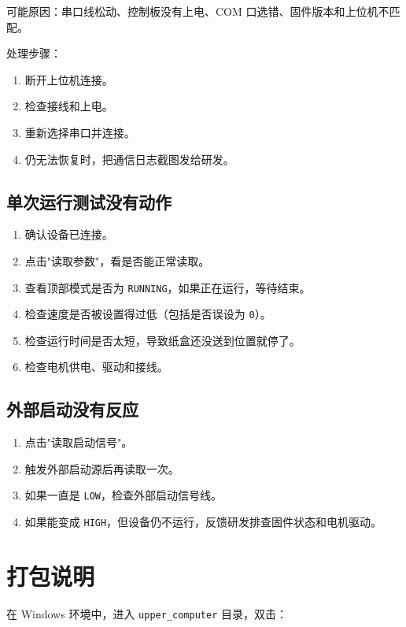 可能原因：串口线松动、控制板没有上电、COM 口选错、固件版本和上位机不匹配。

处理步骤：
\begin{enumerate}[label={(\arabic*)}]
    \item 断开上位机连接。
    \item 检查接线和上电。
    \item 重新选择串口并连接。
    \item 仍无法恢复时，把通信日志截图发给研发。
\end{enumerate}

\subsection{单次运行测试没有动作}

\begin{enumerate}[label={(\arabic*)}]
    \item 确认设备已连接。
    \item 点击"读取参数"，看是否能正常读取。
    \item 查看顶部模式是否为 \texttt{RUNNING}，如果正在运行，等待结束。
    \item 检查速度是否被设置得过低（包括是否误设为 \texttt{0}）。
    \item 检查运行时间是否太短，导致纸盒还没送到位置就停了。
    \item 检查电机供电、驱动和接线。
\end{enumerate}

\subsection{外部启动没有反应}

\begin{enumerate}[label={(\arabic*)}]
    \item 点击"读取启动信号"。
    \item 触发外部启动源后再读取一次。
    \item 如果一直是 \texttt{LOW}，检查外部启动信号线。
    \item 如果能变成 \texttt{HIGH}，但设备仍不运行，反馈研发排查固件状态和电机驱动。
\end{enumerate}

\section{打包说明}

在 Windows 环境中，进入 \texttt{upper\_computer} 目录，双击：

